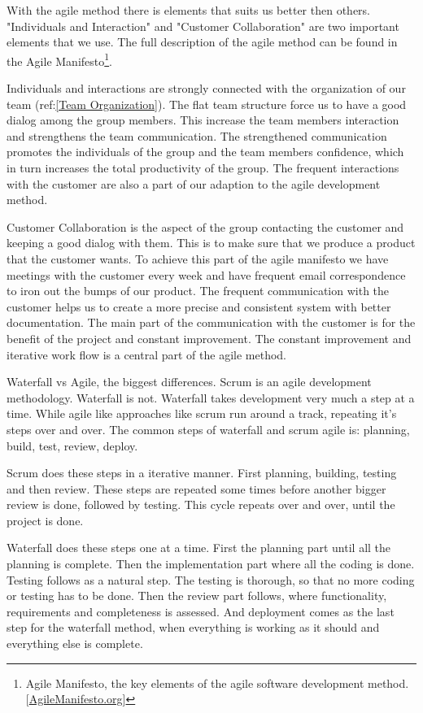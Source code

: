     With the agile method there is elements that suits us better then others. "Individuals and Interaction" and "Customer Collaboration" are two important elements that we use. The full description of the agile method can be found in the Agile Manifesto\footnote
        {Agile Manifesto, the key elements of the agile software development method. [\href{http://http://agilemanifesto.org/}{AgileManifesto.org}]}.
    
    Individuals and interactions are strongly connected with the organization of our team (ref:\ref{Team Organization}). The flat team structure force us to have a good dialog among the group members. This increase the team members interaction and strengthens the team communication. The strengthened communication promotes the individuals of the group and the team members confidence, which in turn increases the total productivity of the group. The frequent interactions with the customer are also a part of our adaption to the agile development method. 
    
    Customer Collaboration is the aspect of the group contacting the customer and keeping a good dialog with them. This is to make sure that we produce a product that the customer wants. To achieve this part of the agile manifesto we have meetings with the customer every week and have frequent email correspondence to iron out the bumps of our product. The frequent communication with the customer helps us to create a more precise and consistent system with better documentation. The main part of the communication with the customer is for the benefit of the project and constant improvement. The constant improvement and iterative work flow is a central part of the agile method. 

    Waterfall vs Agile, the biggest differences. Scrum is an agile development methodology. Waterfall is not. Waterfall takes development very much a step at a time. While agile like approaches like scrum run around a track, repeating it's steps over and over. The common steps of waterfall and scrum agile is: planning, build, test, review, deploy. 
        
    Scrum does these steps in a iterative manner. First planning, building, testing and then review. These steps are repeated some times before another bigger review is done, followed by testing. This cycle repeats over and over, until the project is done. 
    
    Waterfall  does these steps one at a time. First the planning part until all the planning is complete. Then the implementation part where all the coding is done. Testing follows as a natural step. The testing is thorough, so that no more coding or testing has to be done. Then the review part follows, where functionality, requirements and completeness is assessed. And deployment comes as the last step for the waterfall method, when everything is working as it should and everything else is complete.  
    
